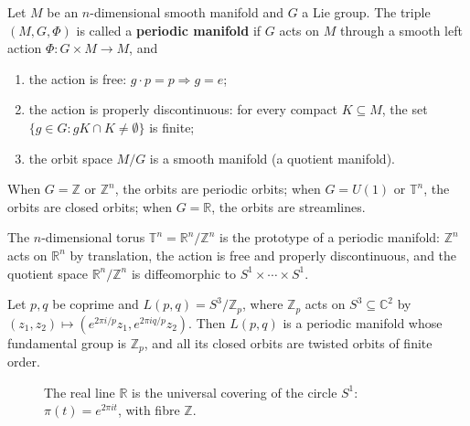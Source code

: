 \begin{definition}\label{def:periodic_manifold}
Let $M$ be an $n$-dimensional smooth manifold and $G$ a Lie group. The triple $(M,G,\Phi)$ is called a \textbf{periodic manifold} if $G$ acts on $M$ through a smooth left action $\Phi:G\times M\to M$, and
\begin{enumerate}[label=(\roman*)]
    \item the action is free: $g\cdot p=p\Rightarrow g=e$;
    \item the action is properly discontinuous: for every compact $K\subseteq M$, the set $\{g\in G:gK\cap K\neq\emptyset\}$ is finite;
    \item the orbit space $M/G$ is a smooth manifold (a quotient manifold).
\end{enumerate}
When $G=\mathbb{Z}$ or $\mathbb{Z}^n$, the orbits are periodic orbits; when $G=U(1)$ or $\mathbb{T}^n$, the orbits are closed orbits; when $G=\mathbb{R}$, the orbits are streamlines.
\end{definition}

\begin{example}\label{ex:torus_periodic_manifold}
The $n$-dimensional torus $\mathbb{T}^n=\mathbb{R}^n/\mathbb{Z}^n$ is the prototype of a periodic manifold: $\mathbb{Z}^n$ acts on $\mathbb{R}^n$ by translation, the action is free and properly discontinuous, and the quotient space $\mathbb{R}^n/\mathbb{Z}^n$ is diffeomorphic to $S^1\times\cdots\times S^1$.
\end{example}

\begin{example}\label{ex:lens_space}
Let $p,q$ be coprime and $L(p,q)=S^3/\mathbb{Z}_p$, where $\mathbb{Z}_p$ acts on $S^3\subseteq\mathbb{C}^2$ by $(z_1,z_2)\mapsto(e^{2\pi i/p}z_1,e^{2\pi i q/p}z_2)$. Then $L(p,q)$ is a periodic manifold whose fundamental group is $\mathbb{Z}_p$, and all its closed orbits are twisted orbits of finite order.
\end{example}

\begin{figure}[htbp]
\centering
{}
\caption{The real line $\mathbb{R}$ is the universal covering of the circle $S^1$: $\pi(t)=e^{2\pi i t}$, with fibre $\mathbb{Z}$.}
\label{fig:covering_R_S1_periodic}
\end{figure}

